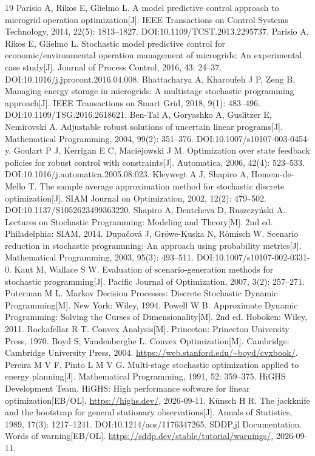 \documentclass[UTF8,a4paper,zihao=-4,fontset=mac]{ctexart}
\begin{document}
{\footnotesize
\begin{thebibliography}{19}
\setlength{\itemsep}{0.2em}
 Parisio A, Rikos E, Glielmo L. A model predictive control approach to microgrid operation optimization[J]. IEEE Transactions on Control Systems Technology, 2014, 22(5): 1813--1827. DOI:10.1109/TCST.2013.2295737.
 Parisio A, Rikos E, Glielmo L. Stochastic model predictive control for economic/environmental operation management of microgrids: An experimental case study[J]. Journal of Process Control, 2016, 43: 24--37. DOI:10.1016/j.jprocont.2016.04.008.
 Bhattacharya A, Kharoufeh J P, Zeng B. Managing energy storage in microgrids: A multistage stochastic programming approach[J]. IEEE Transactions on Smart Grid, 2018, 9(1): 483--496. DOI:10.1109/TSG.2016.2618621.
 Ben-Tal A, Goryashko A, Guslitzer E, Nemirovski A. Adjustable robust solutions of uncertain linear programs[J]. Mathematical Programming, 2004, 99(2): 351--376. DOI:10.1007/s10107-003-0454-y.
 Goulart P J, Kerrigan E C, Maciejowski J M. Optimization over state feedback policies for robust control with constraints[J]. Automatica, 2006, 42(4): 523--533. DOI:10.1016/j.automatica.2005.08.023.
 Kleywegt A J, Shapiro A, Homem-de-Mello T. The sample average approximation method for stochastic discrete optimization[J]. SIAM Journal on Optimization, 2002, 12(2): 479--502. DOI:10.1137/S1052623499363220.
 Shapiro A, Dentcheva D, Ruszczyński A. Lectures on Stochastic Programming: Modeling and Theory[M]. 2nd ed. Philadelphia: SIAM, 2014.
 Dupačová J, Gröwe-Kuska N, Römisch W. Scenario reduction in stochastic programming: An approach using probability metrics[J]. Mathematical Programming, 2003, 95(3): 493--511. DOI:10.1007/s10107-002-0331-0.
 Kaut M, Wallace S W. Evaluation of scenario-generation methods for stochastic programming[J]. Pacific Journal of Optimization, 2007, 3(2): 257--271.
 Puterman M L. Markov Decision Processes: Discrete Stochastic Dynamic Programming[M]. New York: Wiley, 1994.
 Powell W B. Approximate Dynamic Programming: Solving the Curses of Dimensionality[M]. 2nd ed. Hoboken: Wiley, 2011.
 Rockafellar R T. Convex Analysis[M]. Princeton: Princeton University Press, 1970.
 Boyd S, Vandenberghe L. Convex Optimization[M]. Cambridge: Cambridge University Press, 2004. \url{https://web.stanford.edu/~boyd/cvxbook/}.
 Pereira M V F, Pinto L M V G. Multi-stage stochastic optimization applied to energy planning[J]. Mathematical Programming, 1991, 52: 359--375.
 HiGHS Development Team. HiGHS: High performance software for linear optimization[EB/OL]. \url{https://highs.dev/}, 2026-09-11.
 Künsch H R. The jackknife and the bootstrap for general stationary observations[J]. Annals of Statistics, 1989, 17(3): 1217--1241. DOI:10.1214/aos/1176347265.
 SDDP.jl Documentation. Words of warning[EB/OL]. \url{https://sddp.dev/stable/tutorial/warnings/}, 2026-09-11.
\end{thebibliography}
}
\label{bodyend}
\clearpage
\appendix

\end{document}
